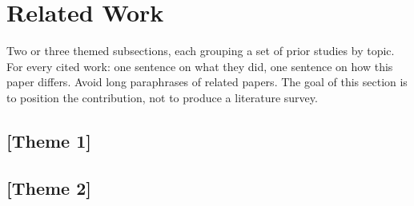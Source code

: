 \section{Related Work}
Two or three themed subsections, each grouping a set of prior studies by
topic. For every cited work: one sentence on what they did, one sentence
on how this paper differs. Avoid long paraphrases of related papers.
The goal of this section is to position the contribution, not to produce
a literature survey.
\subsection{[Theme 1]}
 
\subsection{[Theme 2]}

\clearpage
